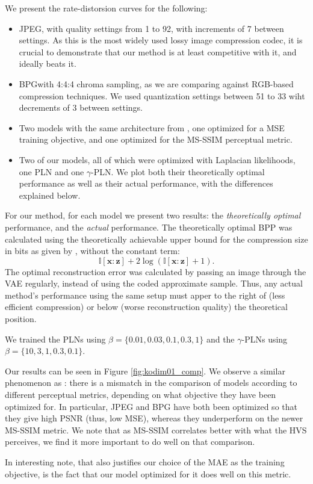 \documentclass{article}
\renewcommand{\vec}[1]{\mathbf{#1}}
\newcommand{\I}{\mathbb{I}}
\begin{document}
We present the rate-distorsion curves for the following:
\begin{itemize}
\item JPEG, with quality settings from 1 to 92, with increments of 7 between
  settings. As this is the most widely used lossy image compression codec, it is
  crucial to demonstrate that our method is at least competitive with it, and
  ideally beats it.
\item BPG\footnotemark with 4:4:4 chroma sampling, as we are comparing against
  RGB-based compression techniques. We used quantization settings between 51 to
  33 wiht decrements of 3 between settings.
\item Two models with the same architecture from \cite{balle2018variational},
  one optimized for a MSE training objective, and one optimized for the
  MS-SSIM perceptual metric.
\item Two of our models, all of which were optimized with Laplacian likelihoods,
  one PLN and one $\gamma$-PLN. We plot both their theoretically optimal
  performance as well as their actual performance, with the differences
  explained below.
\end{itemize}

\par
For our method, for each model we present two results: the \textit{theoretically
optimal} performance, and the \textit{actual} performance. The theoretically
optimal BPP was calculated using the theoretically achievable upper bound for
the compression size in bits as given by \cite{harsha2007communication},
without the constant term:
\[
  \I[\vec{x} : \vec{z}] + 2 \log \left( \I[\vec{x} : \vec{z}] + 1\right).
\]
The optimal reconstruction error was calculated by passing an image through the
VAE regularly, instead of using the coded approximate sample. Thus, any
actual method's performance using the same setup must apper to the right of (less
efficient compression) or below (worse reconstruction quality) the theoretical
position.


We trained the PLNs using $\beta = \{0.01, 0.03, 0.1, 0.3, 1\}$ and the
$\gamma$-PLNs using $\beta = \{10, 3, 1, 0.3, 0.1\}$.

Our results can be seen in Figure \ref{fig:kodim01_comp}. We observe a similar
phenomenon as \cite{balle2018variational}: there is a mismatch in the comparison
of models according to different perceptual metrics, depending on what objective
they have been optimized for. In particular, JPEG and BPG have both been
optimized so that they give high PSNR (thus, low MSE), whereas they underperform
on the newer MS-SSIM metric. We note that as MS-SSIM correlates better with what
the HVS perceives, we find it more important to do well on that comparison.
\par
In interesting note, that also justifies our choice of the MAE as the training
objective, is the fact that our model optimized for it does well on this metric.
\end{document}
